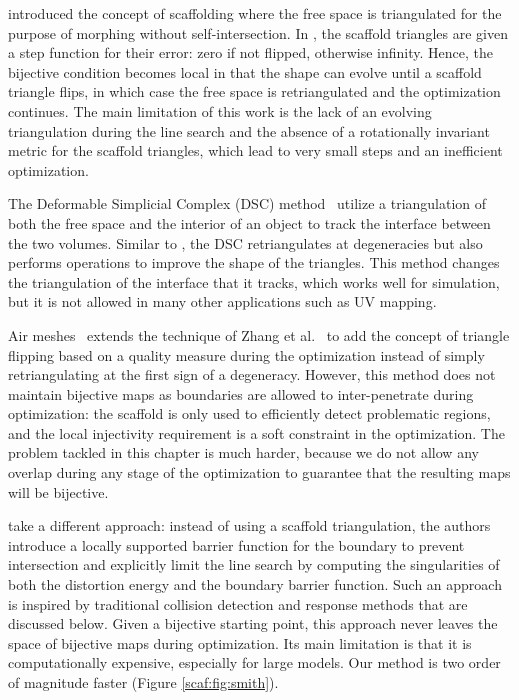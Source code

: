 \cite{Gotsman:2001, surazhsky2001morphing} introduced the concept of scaffolding where the free space is triangulated for the purpose of morphing without self-intersection. In \cite{Zhang:2005}, the scaffold triangles are given a step function for their error: zero if not flipped, otherwise infinity. Hence, the bijective condition becomes local in that the shape can evolve until a scaffold triangle flips, in which case the free space is retriangulated and the optimization continues. The main limitation of this work is the lack of an evolving triangulation during the line search and the absence of a rotationally invariant metric for the scaffold triangles, which lead to very small steps and an inefficient optimization.

The Deformable Simplicial Complex (DSC) method~\cite{Misztal:2012} utilize a triangulation of both the free space and the interior of an object to track the interface between the two volumes.  Similar to \cite{Zhang:2005}, the DSC retriangulates at degeneracies but also performs operations to improve the shape of the triangles.  This method changes the triangulation of the interface that it tracks, which works well for simulation, but it is not allowed in many other applications such as UV mapping.

Air meshes~\cite{Muller:2015} extends the technique of Zhang et al.~\cite{Zhang:2005} to add the concept of triangle flipping based on a quality measure during the optimization instead of simply retriangulating at the first sign of a degeneracy. However, this method does not maintain bijective maps as boundaries are allowed to inter-penetrate during optimization: the scaffold is only used to efficiently detect problematic regions, and the local injectivity requirement is a soft constraint in the optimization. The problem tackled in this chapter is much harder, because we do not allow any overlap during any stage of the optimization to guarantee that the resulting maps will be bijective.

\citep{Smith:2015} take a different approach: instead of using a scaffold triangulation, the authors introduce a locally supported barrier function for the boundary to prevent intersection and explicitly limit the line search by computing the singularities of both the distortion energy and the boundary barrier function. Such an approach is inspired by traditional collision detection and response methods that are discussed below. Given a  bijective starting point, this approach never leaves the space of bijective maps during optimization.  Its main limitation is that it is computationally expensive, especially for large models. Our method is two order of magnitude faster (Figure \ref{scaf:fig:smith}).

